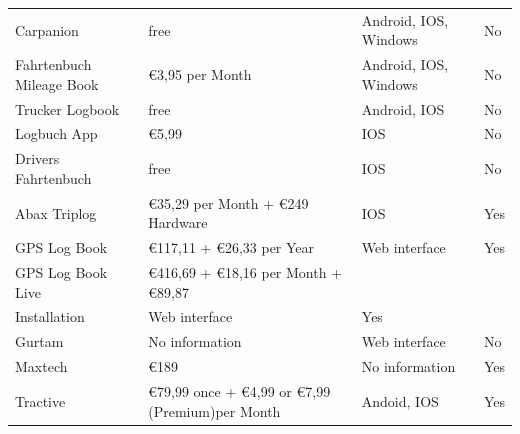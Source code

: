 \begin{singlespace}
\begin{tabular}{p{3cm}p{5cm}p{3cm}p{2cm}}
Carpanion                  & free                                                                                                        & Android, IOS, Windows & No  \\ 
Fahrtenbuch Mileage Book   & \euro 3,95 per Month                                                                                        & Android, IOS, Windows & No  \\ 
Trucker Logbook            & free                                                                                                        & Android, IOS          & No  \\ 
Logbuch App                & \euro 5,99                                                                                                  & IOS                   & No  \\ 
Drivers Fahrtenbuch        & free                                                                                                        & IOS                   & No  \\ 
Abax Triplog               & \euro 35,29 per Month + \euro 249 Hardware                                                                  & IOS                   & Yes \\ 
GPS Log Book               & \euro 117,11 + \euro 26,33 per Year                                                                         & Web interface         & Yes \\ 
GPS Log Book Live          & \euro 416,69 + \euro 18,16 per Month + \euro 89,87\\   Installation & Web interface         & Yes \\
Gurtam                     & No information                                                                                              & Web interface         & No  \\ 
Maxtech                    & \euro 189                                                                                                   & No information        & Yes \\ 
Tractive                   & \euro 79,99 once + \euro 4,99 or \euro 7,99 (Premium)per Month                                              & Andoid, IOS           & Yes \\ 
\bottomrule
\end{tabular}
\end{singlespace}
\clearpageauthor

